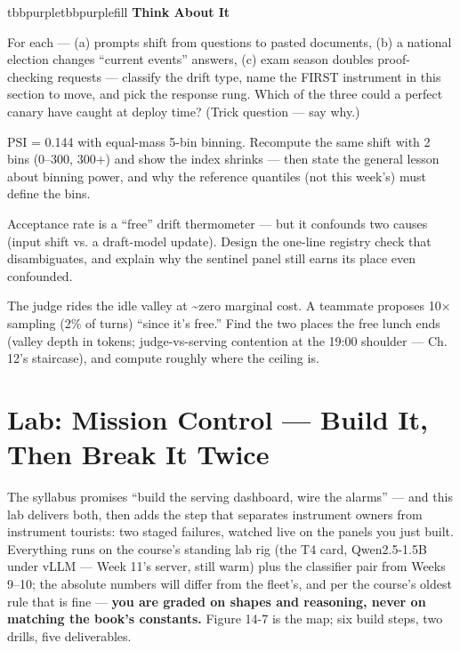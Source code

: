 \begin{calloutbox}{tbbpurple}{tbbpurplefill}
{\normalsize\bfseries\color{tbbpurple}Think About It}\par\vspace{3pt}
\begin{tbbitemize}
  \item For each — (a) prompts shift from questions to pasted documents, (b) a national election changes  “current events” answers, (c) exam season doubles proof-checking requests — classify the drift type, name the FIRST instrument in this section to move, and pick the response rung. Which of the three could a perfect canary have caught at deploy time? (Trick question — say why.)
  \item PSI = 0.144 with equal-mass 5-bin binning. Recompute the same shift with 2 bins (0–300, 300+) and show the index shrinks — then state the general lesson about binning power, and why the reference quantiles (not this week’s) must define the bins.
  \item Acceptance rate is a “free” drift thermometer — but it confounds two causes (input shift vs. a draft-model update). Design the one-line registry check that disambiguates, and explain why the sentinel panel still earns its place even confounded.
  \item The judge rides the idle valley at \textasciitilde{}zero marginal cost. A teammate proposes 10× sampling (2\% of turns) “since it’s free.” Find the two places the free lunch ends (valley depth in tokens; judge-vs-serving contention at the 19:00 shoulder — Ch. 12’s staircase), and compute roughly where the ceiling is.
\end{tbbitemize}
\end{calloutbox}

\section{Lab: Mission Control — Build It, Then Break It Twice}

The syllabus promises “build the serving dashboard, wire the alarms” — and this lab delivers both, then adds the step that separates instrument owners from instrument tourists: two staged failures, watched live on the panels you just built. Everything runs on the course’s standing lab rig (the T4 card, Qwen2.5-1.5B under vLLM — Week 11’s server, still warm) plus the classifier pair from Weeks 9–10; the absolute numbers will differ from the fleet’s, and per the course’s oldest rule that is fine — \textbf{you are graded on shapes and reasoning, never on matching the book’s constants.} Figure 14-7 is the map; six build steps, two drills, five deliverables.

